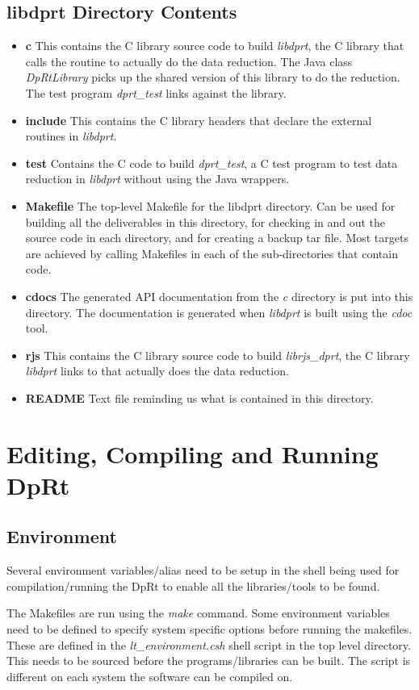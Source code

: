 \documentclass[10pt,a4paper]{article}
\begin{document}
\subsection{libdprt Directory Contents}
\begin{itemize}
\item {\bf c} This contains the C library source code to build {\em libdprt}, the C library that calls the routine
to actually do the data reduction. 
The Java class {\em DpRtLibrary} picks up the shared version of this library to do the reduction.
The test program {\em dprt\_test} links against the library.
\item {\bf include} This contains the C library headers that declare the external routines in {\em libdprt}.
\item {\bf test} Contains the C code to build {\em dprt\_test}, a C test program to test data reduction in 
{\em libdprt} without using the Java wrappers.
\item {\bf Makefile} The top-level Makefile for the libdprt directory. Can be used for building all the
deliverables in this directory, for checking in  and out the source code in each directory, and for creating a 
backup tar file. Most targets are achieved by calling Makefiles in each of the sub-directories that contain code.
\item {\bf cdocs} The generated API documentation from the {\em c} directory is put into this directory. The
documentation is generated when {\em libdprt} is built using the {\em cdoc} tool.
\item {\bf rjs} This contains the C library source code to build {\em librjs\_dprt}, the C library
{\em libdprt} links to that actually does the data reduction.
\item {\bf README} Text file reminding us what is contained in this directory.
\end{itemize}

\section{Editing, Compiling and Running DpRt}
\subsection{Environment}
Several environment variables/alias need to be setup in the shell being used for compilation/running the
DpRt to enable all the libraries/tools to be found.

The Makefiles are run using the {\em make} command. Some environment variables need to be defined to specify
system specific options before running the makefiles. These are defined in the {\em lt\_environment.csh}
shell script in the top level directory. This needs to be sourced before the programs/libraries can be built.
The script is different on each system the software can be compiled on.
\end{document}
